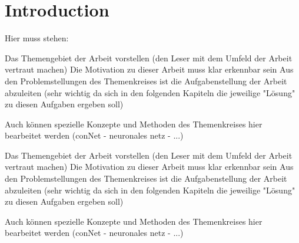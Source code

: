 \chapter{Introduction}

\begin{multicols}{2}
Hier muss stehen:

Das Themengebiet der Arbeit vorstellen (den Leser mit dem Umfeld der Arbeit vertraut machen)
Die Motivation zu dieser Arbeit muss klar erkennbar sein
Aus den Problemstellungen des Themenkreises ist die Aufgabenstellung der Arbeit abzuleiten (sehr wichtig da sich in den folgenden Kapiteln die jeweilige "Lösung" zu diesen Aufgaben ergeben soll)

Auch können spezielle Konzepte und Methoden des Themenkreises hier bearbeitet werden (conNet - neuronales netz - ...)
\end{multicols}


Das Themengebiet der Arbeit vorstellen (den Leser mit dem Umfeld der Arbeit vertraut machen)
Die Motivation zu dieser Arbeit muss klar erkennbar sein
Aus den Problemstellungen des Themenkreises ist die Aufgabenstellung der Arbeit abzuleiten (sehr wichtig da sich in den folgenden Kapiteln die jeweilige "Lösung" zu diesen Aufgaben ergeben soll)

Auch können spezielle Konzepte und Methoden des Themenkreises hier bearbeitet werden (conNet - neuronales netz - ...)


\label{cha:Introduction}


